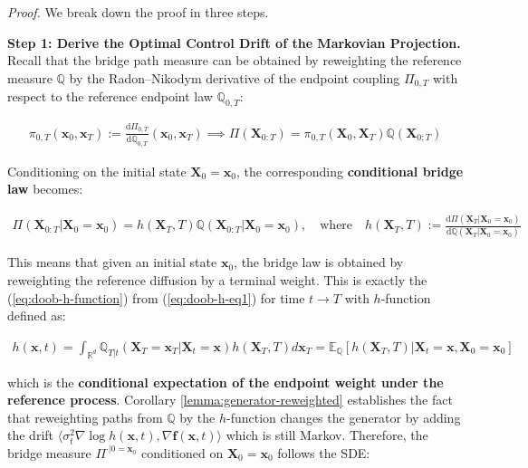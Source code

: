 \documentclass{article}
\begin{document}
\textit{Proof.} We break down the proof in three steps. 

\textbf{Step 1: Derive the Optimal Control Drift of the Markovian Projection.} 
Recall that the bridge path measure can be obtained by reweighting the reference measure $\mathbb{Q}$ by the Radon–Nikodym derivative of the endpoint coupling $\Pi_{0,T}$ with respect to the reference endpoint law $\mathbb{Q}_{0,T}$:
\begin{small}
\begin{align}
    \pi_{0,T}(\boldsymbol{x}_0, \boldsymbol{x}_T):=\frac{\mathrm{d}\Pi_{0,T}}{\mathrm{d}\mathbb{Q}_{0,T}}(\boldsymbol{x}_0, \boldsymbol{x}_T)\implies \Pi(\boldsymbol{X}_{0:T})=\pi_{0,T}(\boldsymbol{X}_0, \boldsymbol{X}_T)\mathbb{Q}(\boldsymbol{X}_{0:T})
\end{align}
\end{small}
Conditioning on the initial state $\boldsymbol{X}_0=\boldsymbol{x}_0$, the corresponding \textbf{conditional bridge law} becomes:
\begin{small}
\begin{align}
    \Pi(\boldsymbol{X}_{0:T}  |\boldsymbol{X}_0=\boldsymbol{x}_0)=h(\boldsymbol{X}_T,T)\mathbb{Q}(\boldsymbol{X}_{0:T} |\boldsymbol{X}_0=\boldsymbol{x}_0), \quad \text{where}\quad h(\boldsymbol{X}_T,T):= \frac{\mathrm{d}\Pi(\boldsymbol{X}_T|\boldsymbol{X}_0=\boldsymbol{x}_0)}{\mathrm{d}\mathbb{Q}(\boldsymbol{X}_T|\boldsymbol{X}_0=\boldsymbol{x}_0)}\label{eq:markov-proj-proof2}
\end{align}
\end{small}
This means that given an initial state $\boldsymbol{x}_0$, the bridge law is obtained by reweighting the reference diffusion by a terminal weight. This is exactly the (\ref{eq:doob-h-function}) from (\ref{eq:doob-h-eq1}) for time $t\to T$ with $h$-function defined as:
\begin{small}
\begin{align}
    h(\boldsymbol{x},t)=\int_{\mathbb{R}^d}\mathbb{Q}_{T|t}(\boldsymbol{X}_T=\boldsymbol{x}_T|\boldsymbol{X}_t=\boldsymbol{x})h(\boldsymbol{X}_T,T)d\boldsymbol{x}_T=\mathbb{E}_{\mathbb{Q}}[h(\boldsymbol{X}_T,T)|\boldsymbol{X}_t=\boldsymbol{x},\boldsymbol{X}_0=\boldsymbol{x}_0]\tag{Doob's $h$-transform}\label{eq:markov-proj-proof1}
\end{align}
\end{small}
which is the \textbf{conditional expectation of the endpoint weight under the reference process}. Corollary \ref{lemma:generator-reweighted} establishes the fact that reweighting paths from $\mathbb{Q}$ by the $h$-function changes the generator by adding the drift $\langle \sigma_t^2\nabla\log h(\boldsymbol{x},t),  \nabla \boldsymbol{f}(\boldsymbol{x},t)\rangle$ which is still Markov. Therefore, the bridge measure $\Pi^{\cdot|0=\boldsymbol{x}_0}$ conditioned on $\boldsymbol{X}_0=\boldsymbol{x}_0$ follows the SDE:
\end{document}
